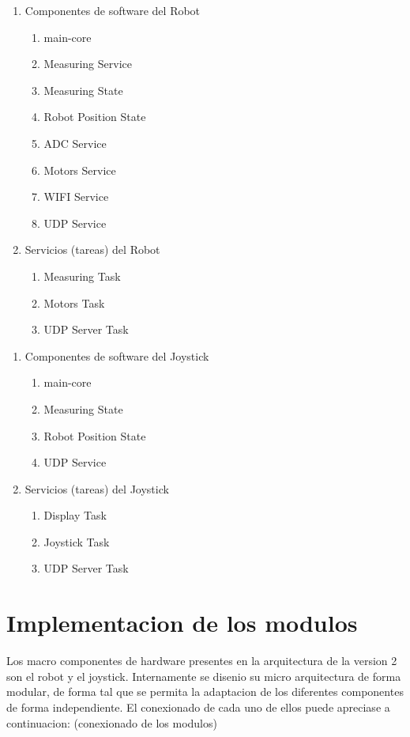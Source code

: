 \begin{enumerate}	
	\item Componentes de software del Robot
	\begin{enumerate}			
		\item main-core
		\item Measuring Service	
		\item Measuring State
		\item Robot Position State
		\item ADC Service
		\item Motors Service
		\item WIFI Service
		\item UDP Service	
	\end{enumerate}	
	\item Servicios (tareas) del Robot
	\begin{enumerate}				
		\item Measuring Task		
		\item Motors Task	
		\item UDP Server Task
	\end{enumerate}			
\end{enumerate}		


\begin{enumerate}	
	\item Componentes de software del Joystick
	\begin{enumerate}			
		\item main-core
		\item Measuring State
		\item Robot Position State
		\item UDP Service	
	\end{enumerate}	
	\item Servicios (tareas) del Joystick
	\begin{enumerate}				
		\item Display Task		
		\item Joystick Task	
		\item UDP Server Task
	\end{enumerate}			
\end{enumerate}		

\section{Implementacion de los modulos}

Los macro componentes de hardware presentes en la arquitectura de la version 2 son el robot y el joystick.
Internamente se disenio su micro arquitectura de forma modular, de forma tal que se permita la adaptacion de los diferentes componentes de forma independiente.
El conexionado de cada uno de ellos puede apreciase a continuacion:
(conexionado de los modulos)

